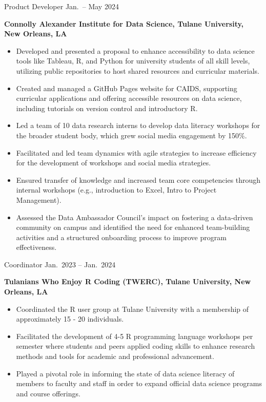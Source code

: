 \documentclass[
  letterpaper,
  DIV=11,
  numbers=noendperiod]{scrartcl}
\providecommand{\tightlist}{%
  \setlength{\itemsep}{0pt}\setlength{\parskip}{0pt}}\usepackage{longtable,booktabs,array}
\begin{document}
{Product Developer} {Jan.~-- May 2024}

\textbf{Connolly Alexander Institute for Data Science, Tulane
University, New Orleans, LA}

\begin{itemize}
\tightlist
\item
  Developed and presented a proposal to enhance accessibility to data
  science tools like Tableau, R, and Python for university students of
  all skill levels, utilizing public repositories to host shared
  resources and curricular materials.
\item
  Created and managed a GitHub Pages website for CAIDS, supporting
  curricular applications and offering accessible resources on data
  science, including tutorials on version control and introductory R.
\item
  Led a team of 10 data research interns to develop data literacy
  workshops for the broader student body, which grew social media
  engagement by 150\%.
\item
  Facilitated and led team dynamics with agile strategies to increase
  efficiency for the development of workshops and social media
  strategies.
\item
  Ensured transfer of knowledge and increased team core competencies
  through internal workshops (e.g., introduction to Excel, Intro to
  Project Management).
\item
  Assessed the Data Ambassador Council's impact on fostering a
  data-driven community on campus and identified the need for enhanced
  team-building activities and a structured onboarding process to
  improve program effectiveness.
\end{itemize}

{Coordinator} {Jan.~2023 -- Jan.~2024}

\textbf{Tulanians Who Enjoy R Coding (TWERC), Tulane University, New
Orleans, LA}

\begin{itemize}
\tightlist
\item
  Coordinated the R user group at Tulane University with a membership of
  approximately 15 - 20 individuals.
\item
  Facilitated the development of 4-5 R programming language workshops
  per semester where students and peers applied coding skills to enhance
  research methods and tools for academic and professional advancement.
\item
  Played a pivotal role in informing the state of data science literacy
  of members to faculty and staff in order to expand official data
  science programs and course offerings.
\end{itemize}
\end{document}
